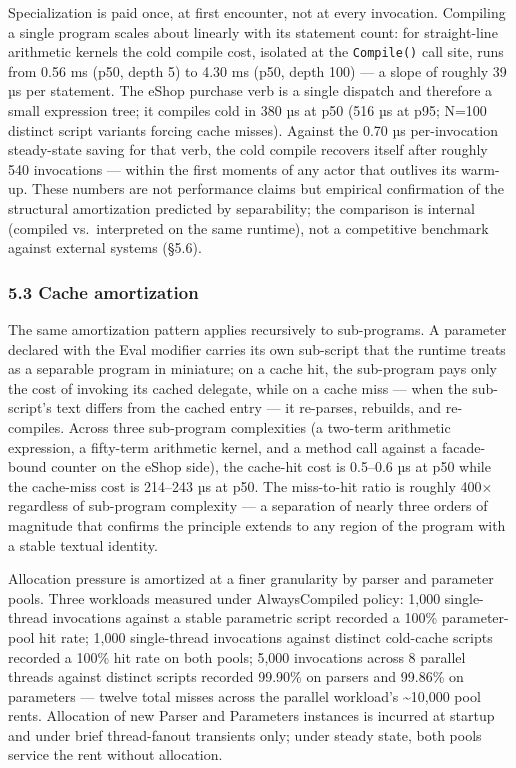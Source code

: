 \documentclass[
]{article}
\let\origtexttt\texttt%
\renewcommand{\texttt}[1]{\origtexttt{\seqsplit{#1}}}%
\let\texttt\origtexttt%
\begin{document}
Specialization is paid once, at first encounter, not at every
invocation. Compiling a single program scales about linearly with its
statement count: for straight-line arithmetic kernels the cold compile
cost, isolated at the \texttt{Compile()} call site, runs from 0.56 ms
(p50, depth 5) to 4.30 ms (p50, depth 100) --- a slope of roughly 39 µs
per statement. The eShop purchase verb is a single dispatch and
therefore a small expression tree; it compiles cold in 380 µs at p50
(516 µs at p95; N=100 distinct script variants forcing cache misses).
Against the 0.70 µs per-invocation steady-state saving for that verb,
the cold compile recovers itself after roughly 540 invocations ---
within the first moments of any actor that outlives its warm-up. These
numbers are not performance claims but empirical confirmation of the
structural amortization predicted by separability; the comparison is
internal (compiled vs.~interpreted on the same runtime), not a
competitive benchmark against external systems (§5.6).

\subsubsection{5.3 Cache amortization}\label{cache-amortization}

The same amortization pattern applies recursively to sub-programs. A
parameter declared with the Eval modifier carries its own sub-script
that the runtime treats as a separable program in miniature; on a cache
hit, the sub-program pays only the cost of invoking its cached delegate,
while on a cache miss --- when the sub-script's text differs from the
cached entry --- it re-parses, rebuilds, and re-compiles. Across three
sub-program complexities (a two-term arithmetic expression, a fifty-term
arithmetic kernel, and a method call against a facade-bound counter on
the eShop side), the cache-hit cost is 0.5--0.6 µs at p50 while the
cache-miss cost is 214--243 µs at p50. The miss-to-hit ratio is roughly
400× regardless of sub-program complexity --- a separation of nearly
three orders of magnitude that confirms the principle extends to any
region of the program with a stable textual identity.

Allocation pressure is amortized at a finer granularity by parser and
parameter pools. Three workloads measured under AlwaysCompiled policy:
1,000 single-thread invocations against a stable parametric script
recorded a 100\% parameter-pool hit rate; 1,000 single-thread
invocations against distinct cold-cache scripts recorded a 100\% hit
rate on both pools; 5,000 invocations across 8 parallel threads against
distinct scripts recorded 99.90\% on parsers and 99.86\% on parameters
--- twelve total misses across the parallel workload's
\textasciitilde10,000 pool rents. Allocation of new Parser and
Parameters instances is incurred at startup and under brief
thread-fanout transients only; under steady state, both pools service
the rent without allocation.
\end{document}
